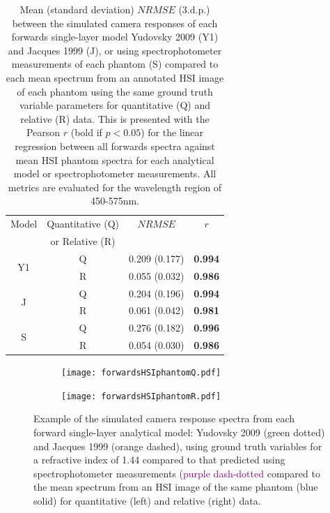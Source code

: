 \begin{table}[h!] %
    \centering
    \caption{Mean (standard deviation) $NRMSE$ (3.d.p.) between the simulated camera responses of each forwards single-layer model Yudovsky 2009 (Y1) and Jacques 1999 (J), or using spectrophotometer measurements of each phantom (S) compared to each mean spectrum from an annotated HSI image of each phantom using the same ground truth variable parameters for quantitative (Q) and relative (R) data. This is presented with the Pearson $r$ (bold if $p < 0.05$) for the linear regression between all forwards spectra against mean HSI phantom spectra for each analytical model or spectrophotometer measurements. All metrics are evaluated for the wavelength region of 450-575nm.}
    \begin{tabular}{|c|c|cc|}
        \hline
        Model & Quantitative (Q) & $NRMSE$ & $r$ \\
         & or Relative (R) &  & \\
        \hline
        \multirow{2}{*}{Y1} & Q & 0.209 (0.177) & \textbf{0.994} \\
        & R & 0.055 (0.032) & \textbf{0.986} \\ %
        \hline
        \multirow{2}{*}{J} & Q & 0.204 (0.196) & \textbf{0.994} \\
        & R & 0.061 (0.042) & \textbf{0.981} \\
        \hline
        \multirow{2}{*}{S} & Q & 0.276 (0.182) & \textbf{0.996} \\
         & R & 0.054 (0.030) & \textbf{0.986} \\
        \hline
    \end{tabular}
    \label{tb:forwardsHSIphantoms}
\end{table}

\begin{figure}[h!]
    \centering
    \begin{subfigure}{0.49\textwidth}
        \texttt{[image: forwardsHSIphantomQ.pdf]}
        \caption{}
        \label{fig:egforwardsHSIQ}
    \end{subfigure}
    \begin{subfigure}{0.49\textwidth}
        \texttt{[image: forwardsHSIphantomR.pdf]}
        \caption{}
        \label{fig:egforwardsHSIR}
    \end{subfigure}
    \caption{Example of the simulated camera response spectra from each forward single-layer analytical model: Yudovsky 2009 (\textcolor{MyGreen}{green dotted}) and Jacques 1999 (\textcolor{MyOrange}{orange dashed}), using ground truth variables for a refractive index of 1.44 compared to that predicted using spectrophotometer measurements (\textcolor{purple}{purple dash-dotted} compared to the mean spectrum from an HSI image of the same phantom (\textcolor{MyBlue}{blue solid}) for quantitative (left) and relative (right) data.}
    \label{fig:forwardsHSIphantoms}
\end{figure}

